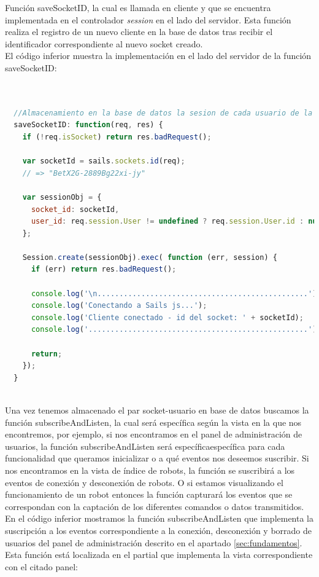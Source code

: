 Función saveSocketID, la cual es llamada en cliente y que se encuentra implementada en el controlador \emph{session} en el lado del servidor. Esta función realiza el registro de un nuevo cliente en
la base de datos tras recibir el identificador correspondiente al nuevo socket creado.\\

El código inferior muestra la implementación en el lado del servidor de la función saveSocketID:\\

\begin{lstlisting}[language=JavaScript]


  //Almacenamiento en la base de datos la sesion de cada usuario de la pagina
  saveSocketID: function(req, res) {
    if (!req.isSocket) return res.badRequest();

    var socketId = sails.sockets.id(req);
    // => "BetX2G-2889Bg22xi-jy"

    var sessionObj = {
      socket_id: socketId,
      user_id: req.session.User != undefined ? req.session.User.id : null
    };

    Session.create(sessionObj).exec( function (err, session) {
      if (err) return res.badRequest();

      console.log('\n................................................');
      console.log('Conectando a Sails js...');
      console.log('Cliente conectado - id del socket: ' + socketId);
      console.log('..................................................');

      return;
    });
  }
  
\end{lstlisting}

Una vez tenemos almacenado el par socket-usuario en base de datos buscamos la función subscribeAndListen, la cual será específica según la vista en la que nos encontremos, por ejemplo, si nos encontramos en el panel
de administración de usuarios, la función subscribeAndListen será específicaespecífica para cada funcionalidad que queramos inicializar o a qué eventos nos deseemos suscribir. Si nos encontramos en la vista de índice de robots, la función se suscribirá 
a los eventos de conexión y desconexión de robots. O si estamos visualizando el funcionamiento de un robot entonces la función capturará los eventos que se correspondan con la captación de los diferentes comandos o datos transmitidos.\\

En el código inferior mostramos la función subscribeAndListen que implementa la suscripción a los eventos correspondiente a la conexión, desconexión y borrado de usuarios del panel de
administración descrito en el apartado \ref{sec:fundamentos}. Esta función está localizada en el partial que implementa la vista correspondiente con el citado panel:\\

